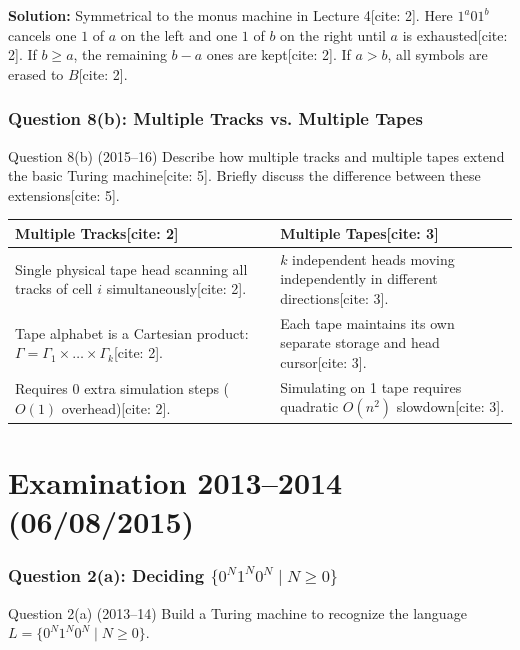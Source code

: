 \documentclass[11pt,a4paper]{article}
\begin{document}
\begin{solutionbox}
\textbf{Solution:} Symmetrical to the monus machine in Lecture 4[cite: 2]. Here $1^a 0 1^b$ cancels one $1$ of $a$ on the left and one $1$ of $b$ on the right until $a$ is exhausted[cite: 2]. If $b \ge a$, the remaining $b-a$ ones are kept[cite: 2]. If $a > b$, all symbols are erased to $B$[cite: 2].
\end{solutionbox}

\section{Question 8(b): Multiple Tracks vs. Multiple Tapes}
\begin{questionbox}{Question 8(b) (2015--16)}
Describe how multiple tracks and multiple tapes extend the basic Turing machine[cite: 5]. Briefly discuss the difference between these extensions[cite: 5].
\end{questionbox}

\begin{solutionbox}
\begin{center}
\small
\begin{tabular}{p{7.5cm}p{7.5cm}}
\toprule
\textbf{Multiple Tracks}[cite: 2] & \textbf{Multiple Tapes}[cite: 3] \\
\midrule
Single physical tape head scanning all tracks of cell $i$ simultaneously[cite: 2]. & $k$ independent heads moving independently in different directions[cite: 3]. \\
Tape alphabet is a Cartesian product: $\Gamma = \Gamma_1 \times \dots \times \Gamma_k$[cite: 2]. & Each tape maintains its own separate storage and head cursor[cite: 3]. \\
Requires 0 extra simulation steps ($O(1)$ overhead)[cite: 2]. & Simulating on 1 tape requires quadratic $O(n^2)$ slowdown[cite: 3]. \\
\bottomrule
\end{tabular}
\end{center}
\end{solutionbox}

\part{Examination 2013--2014 (06/08/2015)}

\section{Question 2(a): Deciding $\{0^N 1^N 0^N \mid N \ge 0\}$}
\begin{questionbox}{Question 2(a) (2013--14)}
Build a Turing machine to recognize the language $L = \{0^N 1^N 0^N \mid N \ge 0\}$.
\end{questionbox}
\end{document}
